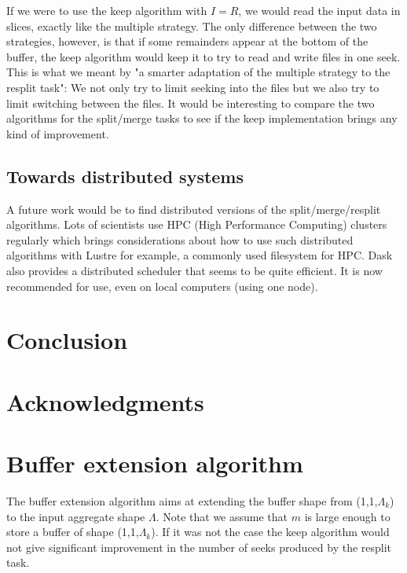 \documentclass[conference]{IEEEtran}
\begin{document}
If we were to use the keep algorithm with $I=R$, we would read the input data
in slices, exactly like the multiple strategy. The only difference between the
two strategies, however, is that if some remainders appear at the bottom of the
buffer, the keep algorithm would keep it to try to read and write files in one
seek. This is what we meant by "a smarter adaptation of the multiple strategy
to the resplit task": We not only try to limit seeking into the files but we
also try to limit switching between the files. It would be interesting to
compare the two algorithms for the split/merge tasks to see if the keep
implementation brings any kind of improvement.

\subsection{Towards distributed systems}
A future work would be to find distributed versions of the split/merge/resplit
algorithms. Lots of scientists use HPC (High Performance Computing) clusters
regularly which brings considerations about how to use such distributed
algorithms with Lustre for example, a commonly used filesystem for HPC. Dask
also provides a distributed scheduler that seems to be quite efficient. It is
now recommended for use, even on local computers (using one node).

\section{Conclusion}

\section{Acknowledgments}




\appendices

\section{Buffer extension algorithm}
\label{bufferExtensionAlgorithm}
The buffer extension algorithm aims at extending the buffer shape from
(1,1,$\Lambda_k$) to the input aggregate shape $\Lambda$. Note that we assume
that $m$ is large enough to store a buffer of shape (1,1,$\Lambda_k$). If it
was not the case the keep algorithm would not give significant improvement in the
number of seeks produced by the resplit task.
\end{document}
